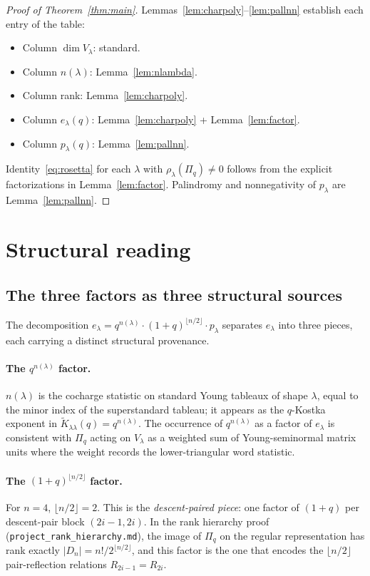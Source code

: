 \documentclass[11pt]{article}
\theoremstyle{definition}
\begin{document}
\begin{proof}[Proof of Theorem~\ref{thm:main}]
Lemmas~\ref{lem:charpoly}--\ref{lem:pallnn} establish each entry of the
table:
\begin{itemize}
\item Column $\dim V_\lambda$: standard.
\item Column $n(\lambda)$: Lemma~\ref{lem:nlambda}.
\item Column rank: Lemma~\ref{lem:charpoly}.
\item Column $e_\lambda(q)$: Lemma~\ref{lem:charpoly} + Lemma~\ref{lem:factor}.
\item Column $p_\lambda(q)$: Lemma~\ref{lem:pallnn}.
\end{itemize}
Identity~\eqref{eq:rosetta} for each $\lambda$ with $\rho_\lambda(\Pi_q) \ne 0$
follows from the explicit factorizations in Lemma~\ref{lem:factor}.
Palindromy and nonnegativity of $p_\lambda$ are Lemma~\ref{lem:pallnn}.
\end{proof}

\section{Structural reading}

\subsection{The three factors as three structural sources}

The decomposition $e_\lambda = q^{n(\lambda)} \cdot (1+q)^{\lfloor n/2 \rfloor}
\cdot p_\lambda$ separates $e_\lambda$ into three pieces, each carrying a
distinct structural provenance.

\paragraph{The $q^{n(\lambda)}$ factor.}
$n(\lambda)$ is the cocharge statistic on standard Young tableaux of shape
$\lambda$, equal to the minor index of the superstandard tableau; it appears
as the $q$-Kostka exponent in $\tilde{K}_{\lambda\lambda}(q) = q^{n(\lambda)}$.
The occurrence of $q^{n(\lambda)}$ as a factor of $e_\lambda$ is consistent
with $\Pi_q$ acting on $V_\lambda$ as a weighted sum of Young-seminormal
matrix units where the weight records the lower-triangular word statistic.

\paragraph{The $(1+q)^{\lfloor n/2\rfloor}$ factor.}
For $n=4$, $\lfloor n/2 \rfloor = 2$. This is the \emph{descent-paired piece}:
one factor of $(1+q)$ per descent-pair block $(2i-1, 2i)$. In the rank
hierarchy proof (\texttt{project\_rank\_hierarchy.md}), the image of
$\Pi_q$ on the regular representation has rank exactly $|D_n| =
n!/2^{\lfloor n/2\rfloor}$, and this factor is the one that encodes the
$\lfloor n/2\rfloor$ pair-reflection relations $R_{2i-1} = R_{2i}$.
\end{document}
